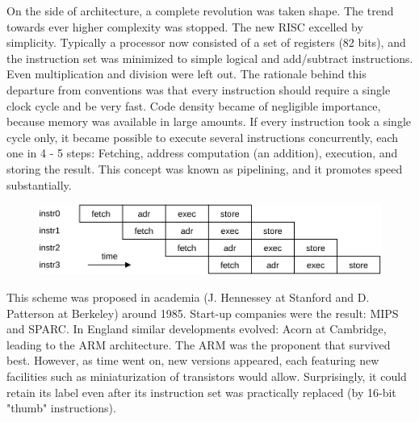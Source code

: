 On the side of architecture, a complete revolution was taken shape. The trend
towards ever higher complexity was stopped. The new RISC excelled by simplicity.
Typically a processor now consisted of a set of registers (82 bits), and the
instruction set was minimized to simple logical and add/subtract instructions. Even
multiplication and division were left out. The rationale behind this departure from
conventions was that every instruction should require a single clock cycle and be
very fast. Code density became of negligible importance, because memory was
available in large amounts. If every instruction took a single cycle only, it became
possible to execute several instructions concurrently, each one in 4 - 5 steps:
Fetching, address computation (an addition), execution, and storing the result. This
concept was known as pipelining, and it promotes speed substantially.
\begin{figure}[h!]
  \centering
  \includegraphics[width=\textwidth]{i/6}
\end{figure}

This scheme was proposed in academia (J. Hennessey at Stanford and D.
Patterson at Berkeley) around 1985. Start-up companies were the result: MIPS
and SPARC. In England similar developments evolved: Acorn at Cambridge,
leading to the ARM architecture. The ARM was the proponent that survived best.
However, as time went on, new versions appeared, each featuring new facilities
such as miniaturization of transistors would allow. Surprisingly, it could retain its
label even after its instruction set was practically replaced (by 16-bit "thumb"
instructions).
